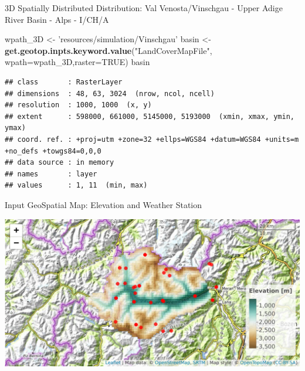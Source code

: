 \documentclass[ignorenonframetext,]{beamer}
\newenvironment{Shaded}{\begin{snugshade}}{\end{snugshade}}
\newcommand{\KeywordTok}[1]{\textcolor[rgb]{0.13,0.29,0.53}{\textbf{#1}}}
\newcommand{\DataTypeTok}[1]{\textcolor[rgb]{0.13,0.29,0.53}{#1}}
\newcommand{\StringTok}[1]{\textcolor[rgb]{0.31,0.60,0.02}{#1}}
\newcommand{\OtherTok}[1]{\textcolor[rgb]{0.56,0.35,0.01}{#1}}
\newcommand{\NormalTok}[1]{#1}
\begin{document}
\begin{frame}[fragile]{3D Spatially Distributed Distribution: Val
Venosta/Vinschgau - Upper Adige River Basin - Alps - I/CH/A}

\begin{Shaded}
\begin{Highlighting}[]
\NormalTok{wpath_3D <-}\StringTok{ 'resources/simulation/Vinschgau'}
\NormalTok{basin <-}\StringTok{ }\KeywordTok{get.geotop.inpts.keyword.value}\NormalTok{(}\StringTok{"LandCoverMapFile"}\NormalTok{,}
              \DataTypeTok{wpath=}\NormalTok{wpath_3D,}\DataTypeTok{raster=}\OtherTok{TRUE}\NormalTok{)}
\NormalTok{basin}
\end{Highlighting}
\end{Shaded}

\begin{verbatim}
## class       : RasterLayer 
## dimensions  : 48, 63, 3024  (nrow, ncol, ncell)
## resolution  : 1000, 1000  (x, y)
## extent      : 598000, 661000, 5145000, 5193000  (xmin, xmax, ymin, ymax)
## coord. ref. : +proj=utm +zone=32 +ellps=WGS84 +datum=WGS84 +units=m +no_defs +towgs84=0,0,0 
## data source : in memory
## names       : layer 
## values      : 1, 11  (min, max)
\end{verbatim}

\end{frame}

\begin{frame}{Input GeoSpatial Map: Elevation and Weather Station}

\includegraphics{presentation_files/figure-beamer/unnamed-chunk-14-1.pdf}

\end{frame}
\end{document}
